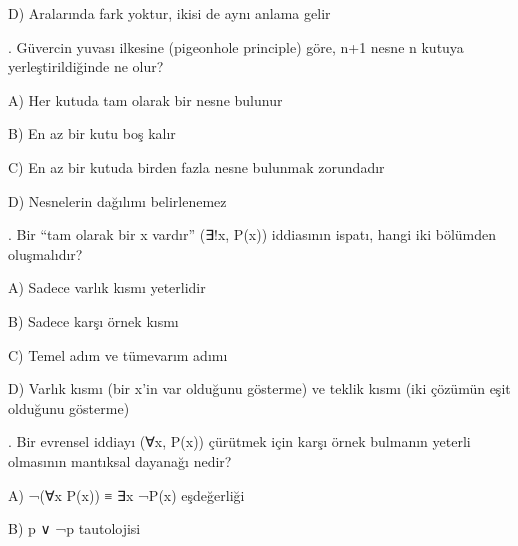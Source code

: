 \par\noindent\hspace*{1.6em}D) Aralarında fark yoktur, ikisi de aynı anlama gelir

\par\smallskip{}. Güvercin yuvası ilkesine (pigeonhole principle) göre, n+1 nesne n kutuya yerleştirildiğinde ne olur?

\par\noindent\hspace*{1.6em}A) Her kutuda tam olarak bir nesne bulunur

\par\noindent\hspace*{1.6em}B) En az bir kutu boş kalır

\par\noindent\hspace*{1.6em}C) En az bir kutuda birden fazla nesne bulunmak zorundadır

\par\noindent\hspace*{1.6em}D) Nesnelerin dağılımı belirlenemez

\par\smallskip{}. Bir “tam olarak bir x vardır” (∃!x, P(x)) iddiasının ispatı, hangi iki bölümden oluşmalıdır?

\par\noindent\hspace*{1.6em}A) Sadece varlık kısmı yeterlidir

\par\noindent\hspace*{1.6em}B) Sadece karşı örnek kısmı

\par\noindent\hspace*{1.6em}C) Temel adım ve tümevarım adımı

\par\noindent\hspace*{1.6em}D) Varlık kısmı (bir x’in var olduğunu gösterme) ve teklik kısmı (iki çözümün eşit olduğunu gösterme)

\par\smallskip{}. Bir evrensel iddiayı (∀x, P(x)) çürütmek için karşı örnek bulmanın yeterli olmasının mantıksal dayanağı nedir?

\par\noindent\hspace*{1.6em}A) ¬(∀x P(x)) ≡ ∃x ¬P(x) eşdeğerliği

\par\noindent\hspace*{1.6em}B) p ∨ ¬p tautolojisi

